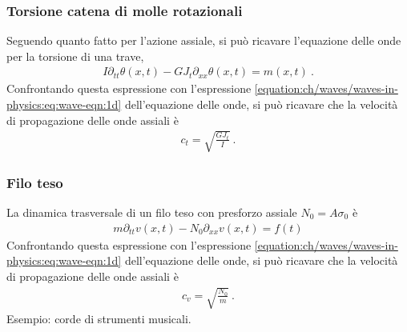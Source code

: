 \documentclass[letterpaper,10pt,italian]{jupyterBook}
\begin{document}
\subsubsection{Torsione \sphinxhyphen{} catena di molle rotazionali}
\label{\detokenize{ch/waves/waves-in-physics:torsione-catena-di-molle-rotazionali}}\label{\detokenize{ch/waves/waves-in-physics:physics-hs-waves-equation-examples-mechanics-torsion}}
\sphinxAtStartPar
Seguendo quanto fatto per l’azione assiale, si può ricavare l’equazione delle onde per la torsione di una trave,
\begin{equation*}
\begin{split}I \partial_{tt} \theta(x,t) - GJ_t \partial_{xx} \theta(x,t) = m(x,t) \ .\end{split}
\end{equation*}
\sphinxAtStartPar
Confrontando questa espressione con l’espressione \eqref{equation:ch/waves/waves-in-physics:eq:wave-eqn:1d} dell’equazione delle onde, si può ricavare che la velocità di propagazione delle onde assiali è
\begin{equation*}
\begin{split}c_{t} = \sqrt{\frac{GJ_t}{I}} \ .\end{split}
\end{equation*}

\subsubsection{Filo teso}
\label{\detokenize{ch/waves/waves-in-physics:filo-teso}}\label{\detokenize{ch/waves/waves-in-physics:physics-hs-waves-equation-examples-mechanics-string}}
\sphinxAtStartPar
La dinamica trasversale di un filo teso con pre\sphinxhyphen{}sforzo assiale \(N_0 = A \sigma_0\) è
\begin{equation*}
\begin{split}m \partial_{tt} v(x,t) - N_0 \partial_{xx} v(x,t) = f(t)\end{split}
\end{equation*}
\sphinxAtStartPar
Confrontando questa espressione con l’espressione \eqref{equation:ch/waves/waves-in-physics:eq:wave-eqn:1d} dell’equazione delle onde, si può ricavare che la velocità di propagazione delle onde assiali è
\begin{equation*}
\begin{split}c_{v} = \sqrt{\frac{N_0}{m}} \ .\end{split}
\end{equation*}
\sphinxAtStartPar
Esempio: corde di strumenti musicali.
\end{document}
